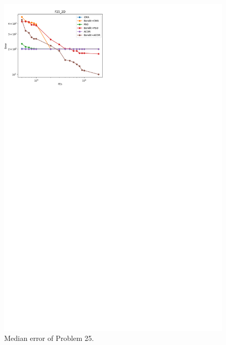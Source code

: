 \begin{figure}
\centering
\includegraphics[width=\textwidth]{Median_F25}
\caption{Median error of Problem 25.}\label{fig:Median_F25}
\end{figure}

